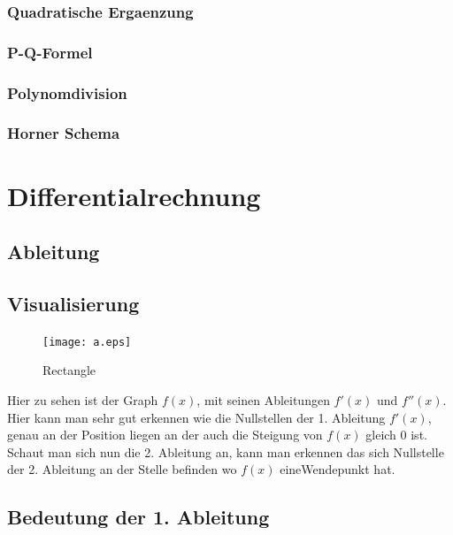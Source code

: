 \documentclass[a4paper]{article} %
\begin{document}
		\subsubsection{Quadratische Ergaenzung}
		\subsubsection{P-Q-Formel}
		\subsubsection{Polynomdivision}
		\subsubsection{Horner Schema}
	\newpage
	\section{Differentialrechnung}
	\subsection{Ableitung}
	\subsection{Visualisierung}
	

	\begin{minipage}{0.3\textwidth}
	\begin{figure}[H]
	\texttt{[image: a.eps]}
	\caption{Rectangle}
	\end{figure}
	\end{minipage} \hfill
	\begin{minipage}{0.5\textwidth}
	
	Hier zu sehen ist der Graph $f(x)$, mit seinen Ableitungen $f'(x)$ und $f''(x)$.
	Hier kann man sehr gut erkennen wie die Nullstellen der 1. Ableitung $f'(x)$, genau an
	der Position liegen an der auch die Steigung von $f(x)$ gleich 0 ist.\\
	Schaut man sich nun die 2. Ableitung an, kann man erkennen das sich Nullstelle der 2. Ableitung an der Stelle befinden wo $f(x)$ eineWendepunkt hat.
	
	\end{minipage}


			
		
	\subsection{Bedeutung der 1. Ableitung}
	
\end{document}
